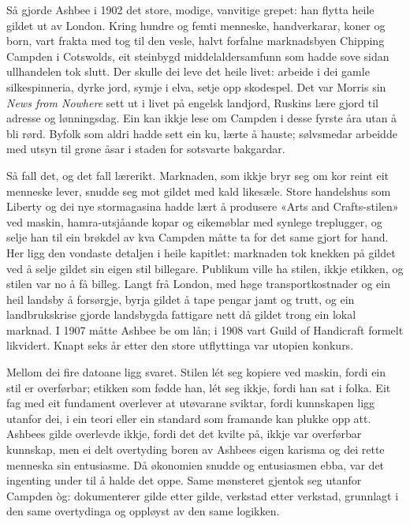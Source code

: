 Så gjorde Ashbee i 1902 det store, modige, vanvitige grepet: han flytta heile gildet ut av London. Kring hundre og femti menneske, handverkarar, koner og born, vart frakta med tog til den vesle, halvt forfalne marknadsbyen Chipping Campden i Cotswolds, eit steinbygd middelaldersamfunn som hadde sove sidan ullhandelen tok slutt. Der skulle dei leve det heile livet: arbeide i dei gamle silkespinneria, dyrke jord, symje i elva, setje opp skodespel. Det var Morris sin \textit{News from Nowhere} sett ut i livet på engelsk landjord, Ruskins lære gjord til adresse og lønningsdag. Ein kan ikkje lese om Campden i desse fyrste åra utan å bli rørd. Byfolk som aldri hadde sett ein ku, lærte å hauste; sølvsmedar arbeidde med utsyn til grøne åsar i staden for sotsvarte bakgardar.

Så fall det, og det fall lærerikt. Marknaden, som ikkje bryr seg om kor reint eit menneske lever, snudde seg mot gildet med kald likesæle. Store handelshus som Liberty og dei nye stormagasina hadde lært å produsere «Arts and Crafts-stilen» ved maskin, hamra-utsjåande kopar og eikemøblar med synlege treplugger, og selje han til ein brøkdel av kva Campden måtte ta for det same gjort for hand. Her ligg den vondaste detaljen i heile kapitlet: marknaden tok knekken på gildet ved å selje gildet sin eigen stil billegare. Publikum ville ha stilen, ikkje etikken, og stilen var no å få billeg. Langt frå London, med høge transportkostnader og ein heil landsby å forsørgje, byrja gildet å tape pengar jamt og trutt, og ein landbrukskrise gjorde landsbygda fattigare nett då gildet trong ein lokal marknad. I 1907 måtte Ashbee be om lån; i 1908 vart Guild of Handicraft formelt likvidert. Knapt seks år etter den store utflyttinga var utopien konkurs.

Mellom dei fire datoane ligg svaret. Stilen lét seg kopiere ved maskin, fordi ein stil er overførbar; etikken som fødde han, lét seg ikkje, fordi han sat i folka. Eit fag med eit fundament overlever at utøvarane sviktar, fordi kunnskapen ligg utanfor dei, i ein teori eller ein standard som framande kan plukke opp att. Ashbees gilde overlevde ikkje, fordi det det kvilte på, ikkje var overførbar kunnskap, men ei delt overtyding boren av Ashbees eigen karisma og dei rette menneska sin entusiasme. Då økonomien snudde og entusiasmen ebba, var det ingenting under til å halde det oppe. Same mønsteret gjentok seg utanfor Campden òg: \textcite{cumming1991} dokumenterer gilde etter gilde, verkstad etter verkstad, grunnlagt i den same overtydinga og oppløyst av den same logikken.

